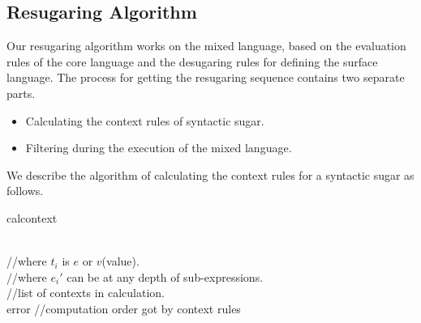 \subsection{Resugaring Algorithm}

Our resugaring algorithm works on the mixed language, based on the evaluation rules of the core language and the desugaring rules for defining the surface language. The process for  getting the resugaring sequence contains two separate parts.

\begin{itemize}
\item Calculating the context rules of syntactic sugar.
\item Filtering  during the execution of the mixed language.
\end{itemize}

We describe the algorithm of calculating the context rules for a syntactic sugar as follows. 

\begin{algorithm}
	\caption{calcontext}
	\label{alg:f}     %
	\begin{algorithmic}[1]       %
		\REQUIRE ~~\\      %
		 //where $t_i$ is $e$ or $v$(value).\\
		 //where $e_i'$ can be at any depth of sub-expressions.\\
		 //list of contexts in calculation.
		\ENSURE ~~\\     %
		\STATE     {}
				\RETURN error
			\ELSE
				\STATE {}
				\STATE \qquad{}
			\ENDIF
		\ENDIF
		\STATE {} //computation order got by context rules
				\STATE {}
				\STATE \qquad{}
			\ELSE
				\STATE {}
				\STATE \qquad{}
				\STATE {}
				\STATE {}
			\ENDIF
		\ENDFOR
		\RETURN {}
		
	\end{algorithmic}
\end{algorithm}

